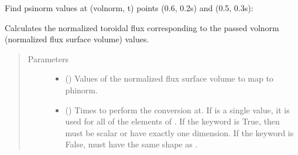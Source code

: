 \documentclass[letterpaper,10pt,english]{sphinxmanual}
\begin{document}
\begin{fulllineitems}
\begin{fulllineitems}
Find psinorm values at (volnorm, t) points (0.6, 0.2s) and (0.5, 0.3s):

\begin{sphinxVerbatim}[commandchars=\\\{\}]
  \PYG{p}{[} \PYG{p}{]} \PYG{p}{[} \PYG{p}{]} 
\end{sphinxVerbatim}

\end{fulllineitems}


\begin{fulllineitems}
\label{\detokenize{eqtools:eqtools.core.Equilibrium.volnorm2phinorm}}
Calculates the normalized toroidal flux corresponding to the passed volnorm (normalized flux surface volume) values.
\begin{quote}\begin{description}
\item[{Parameters}] \leavevmode\begin{itemize}
\item {} 
 () \textendash{} Values of the normalized
flux surface volume to map to phinorm.

\item {} 
 () \textendash{} Times to perform the conversion at.
If  is a single value, it is used for all of the elements of
. If the  keyword is True, then  must be scalar
or have exactly one dimension. If the  keyword is False,
 must have the same shape as .


\end{itemize}
\end{description}
\end{quote}
\end{fulllineitems}
\end{fulllineitems}
\end{document}
